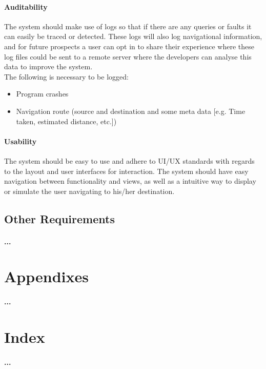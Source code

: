 \documentclass[runningheads,a4paper]{llncs}
\begin{document}
\paragraph{Auditability \\}
 The system should make use of logs so that if there are any  queries or faults it can easily be traced or detected. These logs will also log navigational information, and for future prospects a user can opt in to share their experience where these log files could be sent to a remote server where the developers can analyse this data to improve the system. \\The following is necessary to be logged:
 \begin{itemize}
 	\item Program crashes
 	\item Navigation route (source and destination and some meta data [e.g. Time taken, estimated distance, etc.])
 \end{itemize}
 

\paragraph{Usability \\}
 The system should be easy to use and adhere to UI/UX standards with regards to the layout and user interfaces for interaction. The system should have easy navigation between functionality and views, as well as a intuitive way to display or simulate the user navigating to his/her destination.
 



\subsection{Other Requirements}
\paragraph{...}

\section{Appendixes}
\paragraph{...}

\section{Index}
\paragraph{...}
\end{document}
